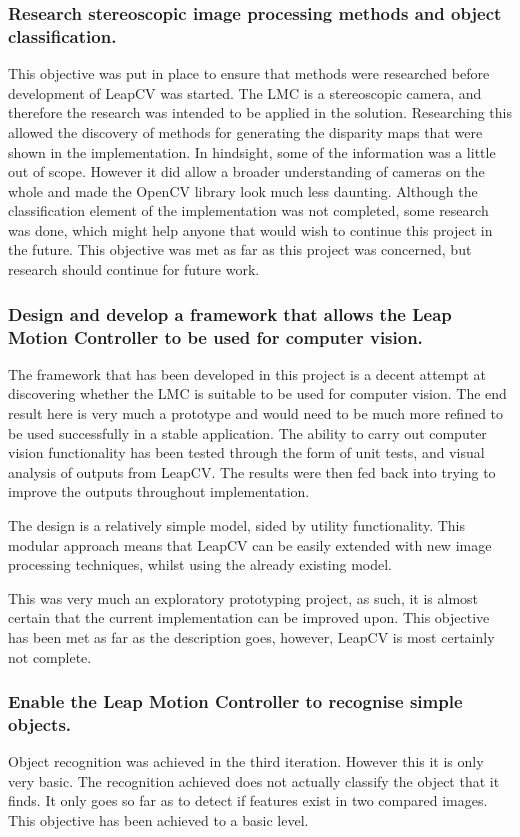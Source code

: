 \documentclass[11pt,oneside]{report}
\begin{document}
		\subsubsection{Research stereoscopic image processing methods and object classification.}
		This objective was put in place to ensure that methods were researched before development of LeapCV was started.
		The LMC is a stereoscopic camera, and therefore the research was intended to be applied in the solution.
		Researching this allowed the discovery of methods for generating the disparity maps that were shown in the implementation.
		In hindsight, some of the information was a little out of scope.
		However it did allow a broader understanding of cameras on the whole and made the OpenCV library look much less daunting.
		Although the classification element of the implementation was not completed, some research was done, which might help anyone that would wish to continue this project in the future.
		This objective was met as far as this project was concerned, but research should continue for future work.
		\subsubsection{Design and develop a framework that allows the Leap Motion Controller to be used for computer vision.}
		The framework that has been developed in this project is a decent attempt at discovering whether the LMC is suitable to be used for computer vision.
		The end result here is very much a prototype and would need to be much more refined to be used successfully in a stable application.
		The ability to carry out computer vision functionality has been tested through the form of unit tests, and visual analysis of outputs from LeapCV.
		The results were then fed back into trying to improve the outputs throughout implementation.

		The design is a relatively simple model, sided by utility functionality.
		This modular approach means that LeapCV can be easily extended with new image processing techniques, whilst using the already existing model.
		
		This was very much an exploratory prototyping project, as such, it is almost certain that the current implementation can be improved upon.
		This objective has been met as far as the description goes, however, LeapCV is most certainly not complete.
		\subsubsection{Enable the Leap Motion Controller to recognise simple objects.}
		Object recognition was achieved in the third iteration.
		However this it is only very basic.
		The recognition achieved does not actually classify the object that it finds.
		It only goes so far as to detect if features exist in two compared images.
		This objective has been achieved to a basic level.
\end{document}
